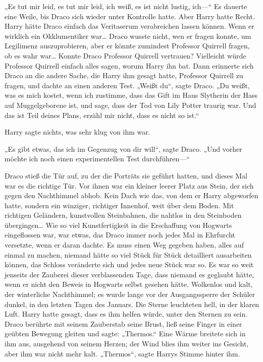 {„Es tut mir leid, es tut mir leid, ich weiß, es ist nicht lustig, ich—“ Es dauerte eine Weile, bis Draco sich wieder unter Kontrolle hatte. Aber Harry hatte Recht. Harry hätte Draco einfach das Veritaserum verabreichen lassen können. Wenn er wirklich ein Okklumentiker war… Draco wusste nicht, wen er fragen konnte, um Legilimenz auszuprobieren, aber er könnte zumindest Professor Quirrell fragen, ob es wahr war… Konnte Draco Professor Quirrell vertrauen? Vielleicht würde Professor Quirrell einfach alles sagen, worum Harry ihn bat. Dann erinnerte sich Draco an die andere Sache, die Harry ihm gesagt hatte, Professor Quirrell zu fragen, und dachte an einen anderen Test. „Weißt du“, sagte Draco. „Du weißt, was es mich kostet, wenn ich zustimme, dass das Gift im Haus Slytherin der Hass auf Muggelgeborene ist, und sage, dass der Tod von Lily Potter traurig war. Und das ist Teil deines Plans, erzähl mir nicht, dass es nicht so ist.“

Harry sagte nichts, was sehr klug von ihm war.

„Es gibt etwas, das ich im Gegenzug von dir will“, sagte Draco. „Und vorher möchte ich noch einen experimentellen Test durchführen—“

Draco stieß die Tür auf, zu der die Porträts sie geführt hatten, und dieses Mal war es die richtige Tür. Vor ihnen war ein kleiner leerer Platz aus Stein, der sich gegen den Nachthimmel abhob. Kein Dach wie das, von dem er Harry abgeworfen hatte, sondern ein winziger, richtiger Innenhof, weit über dem Boden. Mit richtigen Geländern, kunstvollen Steinbahnen, die nahtlos in den Steinboden übergingen… Wie so viel Kunstfertigkeit in die Erschaffung von Hogwarts eingeflossen war, war etwas, das Draco immer noch jedes Mal in Ehrfurcht versetzte, wenn er daran dachte. Es muss einen Weg gegeben haben, alles auf einmal zu machen, niemand hätte so viel Stück für Stück detailliert ausarbeiten können, das Schloss veränderte sich und jedes neue Stück war so. Es war so weit jenseits der Zauberei dieser verblassenden Tage, dass niemand es geglaubt hätte, wenn er nicht den Beweis in Hogwarts selbst gesehen hätte. Wolkenlos und kalt, der winterliche Nachthimmel; es wurde lange vor der Ausgangssperre der Schüler dunkel, in den letzten Tagen des Januars. Die Sterne leuchteten hell, in der klaren Luft. Harry hatte gesagt, dass es ihm helfen würde, unter den Sternen zu sein. Draco berührte mit seinem Zauberstab seine Brust, ließ seine Finger in einer geübten Bewegung gleiten und sagte: „Thermos.“ Eine Wärme breitete sich in ihm aus, ausgehend von seinem Herzen; der Wind blies ihm weiter ins Gesicht, aber ihm war nicht mehr kalt. „Thermos“, sagte Harrys Stimme hinter ihm.

}
